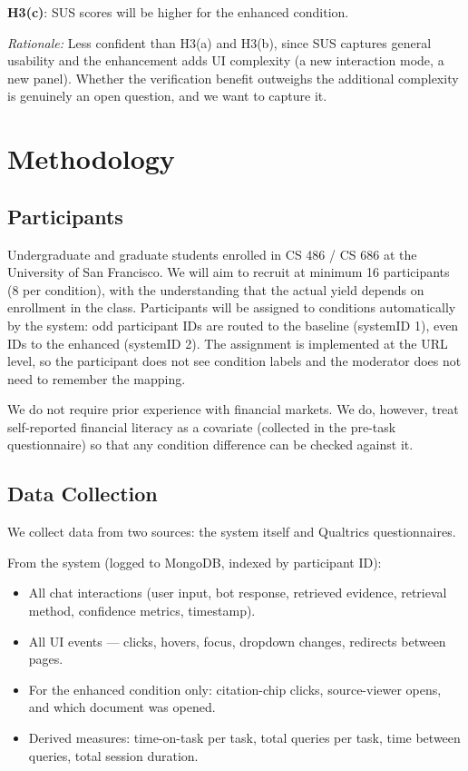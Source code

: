 \textbf{H3(c)}: SUS scores will be higher for the enhanced condition.

\textit{Rationale:} Less confident than H3(a) and H3(b), since SUS captures general usability and the enhancement adds UI complexity (a new interaction mode, a new panel). Whether the verification benefit outweighs the additional complexity is genuinely an open question, and we want to capture it.

\section{Methodology}

\subsection{Participants}

Undergraduate and graduate students enrolled in CS 486 / CS 686 at the University of San Francisco. We will aim to recruit at minimum 16 participants (8 per condition), with the understanding that the actual yield depends on enrollment in the class. Participants will be assigned to conditions automatically by the system: odd participant IDs are routed to the baseline (systemID 1), even IDs to the enhanced (systemID 2). The assignment is implemented at the URL level, so the participant does not see condition labels and the moderator does not need to remember the mapping.

We do not require prior experience with financial markets. We do, however, treat self-reported financial literacy as a covariate (collected in the pre-task questionnaire) so that any condition difference can be checked against it.

\subsection{Data Collection}

We collect data from two sources: the system itself and Qualtrics questionnaires.

From the system (logged to MongoDB, indexed by participant ID):

\begin{itemize}
    \item All chat interactions (user input, bot response, retrieved evidence, retrieval method, confidence metrics, timestamp).
    \item All UI events --- clicks, hovers, focus, dropdown changes, redirects between pages.
    \item For the enhanced condition only: citation-chip clicks, source-viewer opens, and which document was opened.
    \item Derived measures: time-on-task per task, total queries per task, time between queries, total session duration.
\end{itemize}

